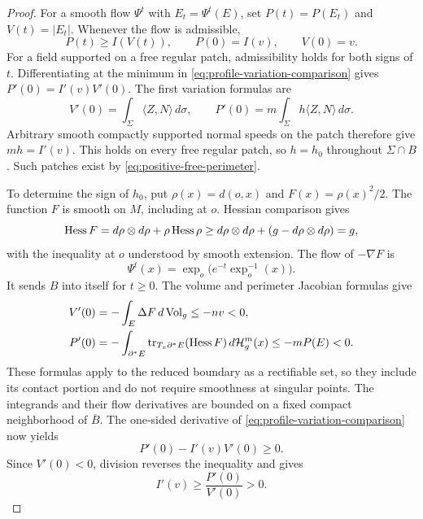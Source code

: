 \begin{proof}
For a smooth flow $\Psi^t$ with $E_t=\Psi^t(E)$, set
$P(t)=P(E_t)$ and $V(t)=|E_t|$.  Whenever the flow is admissible,
\begin{equation}
 \label{eq:profile-variation-comparison}
 P(t)\ge I(V(t)),\qquad P(0)=I(v),\qquad V(0)=v.
\end{equation}
For a field supported on a free regular patch, admissibility holds
for both signs of $t$.  Differentiating at the minimum in
\eqref{eq:profile-variation-comparison} gives
$P'(0)=I'(v)V'(0)$.  The first variation formulas are
\[
 V'(0)=\int_\Sigma\langle Z,N\rangle\,d\sigma,
 \qquad
 P'(0)=m\int_\Sigma h\langle Z,N\rangle\,d\sigma.
\]
Arbitrary smooth compactly supported normal speeds on the patch
therefore give $mh=I'(v)$.  This holds on every free regular patch,
so $h=h_0$ throughout $\Sigma\cap B$.  Such patches exist by
\eqref{eq:positive-free-perimeter}.

To determine the sign of $h_0$, put $\rho(x)=d(o,x)$ and
$F(x)=\rho(x)^2/2$.  The function $F$ is smooth on $M$, including
at $o$.  Hessian comparison gives
\[
 \operatorname{Hess} F=d\rho\otimes d\rho+\rho\operatorname{Hess}\rho
 \ge d\rho\otimes d\rho
       +(g-d\rho\otimes d\rho)
 =g,
\]
with the inequality at $o$ understood by smooth extension.
The flow of $-\nabla F$ is
\[
 \Psi^t(x)=\exp_o\bigl(e^{-t}\exp_o^{-1}(x)\bigr).
\]
It sends $B$ into itself for $t\ge0$.  The volume and perimeter
Jacobian formulas give
\begin{align}
 \label{eq:radial-volume-derivative}
 V'(0)&=-\int_E\Delta F\,d\operatorname{Vol}_g\le -nv<0,\\
 \label{eq:radial-perimeter-derivative}
 P'(0)&=-\int_{\partial^*E}
          \operatorname{tr}_{T_x\partial^*E}(\operatorname{Hess} F)\,d\mathcal H_g^m(x)
          \le -mP(E)<0.
\end{align}
These formulas apply to the reduced boundary as a rectifiable set,
so they include its contact portion and do not require smoothness
at singular points.  The integrands and their flow derivatives are
bounded on a fixed compact neighborhood of $\overline B$.
The one-sided derivative of
\eqref{eq:profile-variation-comparison} now yields
\[
 P'(0)-I'(v)V'(0)\ge0.
\]
Since $V'(0)<0$, division reverses the inequality and gives
\begin{equation}
 \label{eq:profile-derivative-positive}
 I'(v)\ge\frac{P'(0)}{V'(0)}>0.
\end{equation}


\end{proof}
